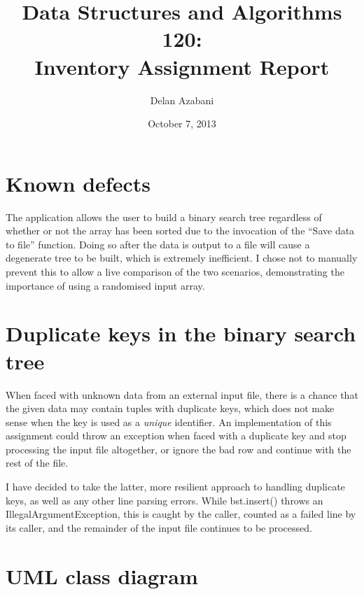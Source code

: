 \documentclass[a4paper,12pt]{article}
\title{Data Structures and Algorithms 120:\\Inventory Assignment Report}
\date{October 7, 2013}
\author{Delan Azabani}
\begin{document}
\maketitle


\section{Known defects}

The application allows the user to build a binary search tree regardless of
whether or not the array has been sorted due to the invocation of the ``Save
data to file'' function. Doing so after the data is output to a file will cause
a degenerate tree to be built, which is extremely inefficient. I chose not to
manually prevent this to allow a live comparison of the two scenarios,
demonstrating the importance of using a randomised input array.

\section{Duplicate keys in the binary search tree}

When faced with unknown data from an external input file, there is a chance
that the given data may contain tuples with duplicate keys, which does not make
sense when the key is used as a \emph{unique} identifier. An implementation of
this assignment could throw an exception when faced with a duplicate key and
stop processing the input file altogether, or ignore the bad row and continue
with the rest of the file.

I have decided to take the latter, more resilient approach to handling
duplicate keys, as well as any other line parsing errors. While bst.insert()
throws an IllegalArgumentException, this is caught by the caller, counted as a
failed line by its caller, and the remainder of the input file continues to be
processed.

\section{UML class diagram}
\end{document}
